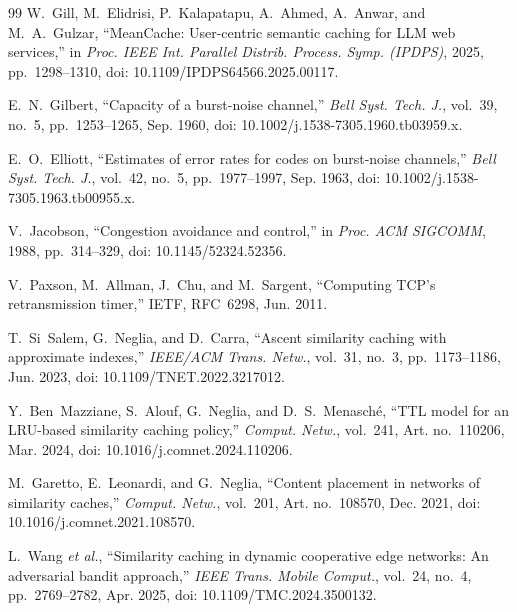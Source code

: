 \documentclass[11pt,a4paper]{article}
\begin{document}
\begin{thebibliography}{99}
W.~Gill, M.~Elidrisi, P.~Kalapatapu, A.~Ahmed, A.~Anwar, and M.~A.~Gulzar, ``MeanCache:
User-centric semantic caching for LLM web services,'' in \emph{Proc. IEEE Int. Parallel Distrib.
Process. Symp. (IPDPS)}, 2025, pp.~1298--1310, doi: 10.1109/IPDPS64566.2025.00117.

E.~N.~Gilbert, ``Capacity of a burst-noise channel,'' \emph{Bell Syst. Tech. J.}, vol.~39, no.~5,
pp.~1253--1265, Sep. 1960, doi: 10.1002/j.1538-7305.1960.tb03959.x.

E.~O.~Elliott, ``Estimates of error rates for codes on burst-noise channels,'' \emph{Bell Syst.
Tech. J.}, vol.~42, no.~5, pp.~1977--1997, Sep. 1963, doi: 10.1002/j.1538-7305.1963.tb00955.x.

V.~Jacobson, ``Congestion avoidance and control,'' in \emph{Proc. ACM SIGCOMM}, 1988,
pp.~314--329, doi: 10.1145/52324.52356.

V.~Paxson, M.~Allman, J.~Chu, and M.~Sargent, ``Computing TCP's retransmission timer,'' IETF,
RFC~6298, Jun. 2011.

T.~Si~Salem, G.~Neglia, and D.~Carra, ``Ascent similarity caching with approximate indexes,''
\emph{IEEE/ACM Trans. Netw.}, vol.~31, no.~3, pp.~1173--1186, Jun. 2023,
doi: 10.1109/TNET.2022.3217012.

Y.~Ben~Mazziane, S.~Alouf, G.~Neglia, and D.~S.~Menasch\'{e}, ``TTL model for an LRU-based
similarity caching policy,'' \emph{Comput. Netw.}, vol.~241, Art. no.~110206, Mar. 2024,
doi: 10.1016/j.comnet.2024.110206.

M.~Garetto, E.~Leonardi, and G.~Neglia, ``Content placement in networks of similarity caches,''
\emph{Comput. Netw.}, vol.~201, Art. no.~108570, Dec. 2021, doi: 10.1016/j.comnet.2021.108570.

L.~Wang \emph{et al.}, ``Similarity caching in dynamic cooperative edge networks: An adversarial
bandit approach,'' \emph{IEEE Trans. Mobile Comput.}, vol.~24, no.~4, pp.~2769--2782, Apr. 2025,
doi: 10.1109/TMC.2024.3500132.

\end{thebibliography}
\end{document}
